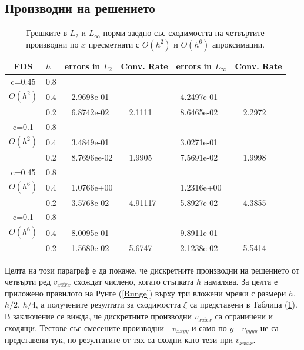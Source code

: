 \documentclass{article}
\newcommand{\rf}[1]{(\ref{#1})}
\begin{document}
\subsection{Производни на решението}
\begin{center}
\begin{table}[ht]
\centering
		\begin{tabular}{||c|l|ll|ll||}
			\hline
			\hline
      FDS       & $h$ &errors in $L_2$&Conv. Rate& errors in $L_\infty$&Conv. Rate\\
   			\hline 
					\hline 
      c=0.45    &0.8    &             &            &           &   \\
   $O(h^2)$     &0.4    &~ 2.9698e-01  &            &~4.2497e-01 &   \\
                &0.2   &~ 6.8742e-02  &~~2.1111  &~8.6465e-02 &~~2.2972 \\
               	 \hline 
     c=0.1      &0.8   &             &           &                & \\
     $O(h^2)$   &0.4   &~ 3.4849e-01  &             &~3.0271e-01      &    \\
                &0.2  &~ 8.7696ee-02 &~~1.9905       &~7.5691e-02      &~~1.9998  \\
			\hline
			\hline 	
      c=0.45    &0.8   &            &            &             &    \\
       $O(h^6)$ &0.4   &~ 1.0766e+00   &           &~1.2316e+00  &   \\
                &0.2  &~ 3.5768e-02 &~~4.91117    &~5.8927e-02  &~~4.3855  \\
					  			\hline 	
     c=0.1      &0.8  &            &               &               &     \\
     $O(h^6)$  &0.4   &~ 8.0095e-01  &              &~9.8911e-01      &        \\
               &0.2  &~ 1.5680e-02&~~5.6747        &~2.1238e-02 &~~5.5414       \\
		   \hline
			\hline 
		\end{tabular}
		\caption{Грешките в $L_2$ и $L_\infty$ норми заедно със сходимостта на четвъртите производни по $x$ пресметнати с $O(h^2)$ и $O(h^6)$ апроксимации.}
\label{tab:fourth-der}
\end{table}
\end{center}
\FloatBarrier
Целта на този параграф е да покаже, че дискретните производни на решението от четвърти ред $v_{\widehat{xxxx}}$ схождат числено, когато стъпката $h$ намалява. За целта е приложено правилото на Рунге \rf{Runge} върху три вложени мрежи с размери $h$, $h/2$, $h/4$, а получените резултати за сходимостта $\xi$ са представени в Таблица \rf{tab:fourth-der}. В заключение се вижда, че дискретните производни $v_{\widehat{xxxx}}$ са ограничени и сходящи. Тестове със смесените производни - $v_{xxyy}$ и само по $y$ - $v_{yyyy}$ не са представени тук, но резултатите от тях са сходни като тези при $v_{xxxx}$.
\end{document}
